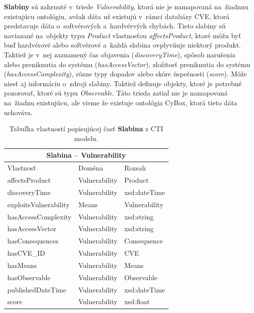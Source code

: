 \documentclass[12pt, a4paper, oneside]{book}
\begin{document}
\textbf{Slabiny} sú zahrnuté v~triede \textit{Vulnerability}, ktorá nie je namapovaná na~žiadnnu existujúcu ontológiu, avšak dáta už existujú v~rámci databázy CVE, ktorá predstavuje dáta o~softvérových a~hardvérvých chybách. Tieto slabiny sú naviazané na~objekty typu \textit{Product} vlastnosťou \textit{affectsProduct}, ktoré môžu byť buď hardvérové alebo softvérové a~každá slabina ovplyvňuje niektorý produkt. Taktiež je v~nej zaznamený čas objavenia (\textit{discoveryTime}), spôsob narušenia alebo preniknutia do systému (\textit{hasAccessVector}), zložitosť preniknutia do systému (\textit{hasAccessComplexity}), rôzne typy dopadov alebo skóre úspešnosti (\textit{score}). Môže niesť aj informáciu o~zdroji slabiny. Taktiež definuje objekty, ktoré je potrebné pozorovať, ktoré sú typu \textit{Observable}. Táto trieda zatiaľ nie je namapovaná na~žiadnu existujúcu, ale vieme že existuje ontológia CyBox, ktorá tieto dáta uchováva. 
\begin{table}[hbt!]
\centering
\begin{tabular}{ |p{5cm}||p{3cm}|p{3cm}|  }
 \hline
 \multicolumn{3}{|c|}{Slabina -- Vulnerability} \\
 \hline
 Vlastnosť & Doména & Rozsah\\
 \hline
 affectsProduct & Vulnerability & Product\\
 discoveryTime & Vulnerability & xsd:dateTime\\
 exploitsVulnerability & Means & Vulnerability\\
 hasAccessComplexity & Vulnerability & xsd:string\\
 hasAccessVector & Vulnerability & xsd:string\\
 hasConsequences & Vulnerability & Consequence\\
 hasCVE\_{}ID & Vulnerability & CVE\\
 hasMeans & Vulnerability & Means\\
 hasObservable & Vulnerability & Observable\\
 publishedDateTime & Vulnerability & xsd:dateTime\\
 score & Vulnerability & xsd:float\\
 \hline
\end{tabular}
\caption{Tabuľka vlastností popisujúcej časť \textbf{Slabina} z CTI modelu.}
\label{tab:template}
\end{table}
\end{document}
